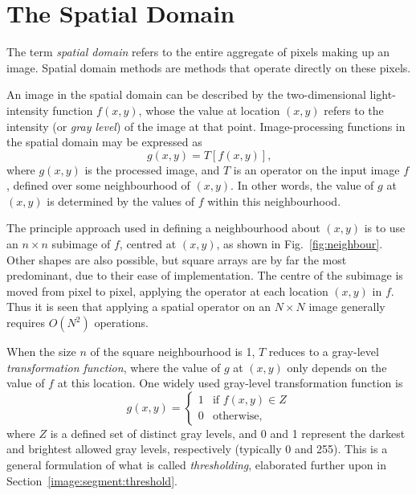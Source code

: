 
\section{The Spatial Domain}
\label{image:spatial}

The term {\em spatial domain\/} refers to the entire aggregate of
pixels making up an image.  Spatial domain methods are methods that
operate directly on these pixels.

An image in the spatial domain can be described by the two-dimensional
light-intensity function $f(x,y)$, whose the value at location $(x,y)$
refers to the intensity (or {\em gray level\/}) of the image at that
point.  Image-processing functions in the spatial domain may be
expressed as
\begin{equation}
\label{eq:spatial_operator}
g(x,y)=T[f(x,y)]\mbox{,}
\end{equation}
where $g(x,y)$ is the processed image, and $T$ is an operator on the
input image $f$, defined over some neighbourhood of $(x,y)$.  In other
words, the value of $g$ at $(x,y)$ is determined by the values of $f$
within this neighbourhood.


The principle approach used in defining a neighbourhood about $(x,y)$
is to use an $n\times n$ subimage of $f$, centred at $(x,y)$, as shown
in Fig.~\ref{fig:neighbour}.  Other shapes are also possible, but
square arrays are by far the most predominant, due to their ease of
implementation.  The centre of the subimage is moved from pixel to
pixel, applying the operator at each location $(x,y)$ in $f$.  Thus it
is seen that applying a spatial operator on an $N\times N$ image
generally requires $O(N^{2})$ operations.

When the size $n$ of the square neighbourhood is 1, $T$ reduces to a
gray-level {\em transformation function\/}, where the value of $g$ at
$(x,y)$ only depends on the value of $f$ at this location.  One widely
used gray-level transformation function is
\begin{equation}
\label{eq:threshold:1}
  g(x,y)=\left\{ \begin{array}{ll} 
                   1 & \mbox{if $f(x,y)\in Z$} \\ 
                   0 & \mbox{otherwise,}
                 \end{array} \right.
\end{equation}
where $Z$ is a defined set of distinct gray levels, and 0 and 1
represent the darkest and brightest allowed gray levels, respectively
(typically 0 and 255).  This is a general formulation of what is
called {\em thresholding\/}, elaborated further upon in
Section~\ref{image:segment:threshold}.

